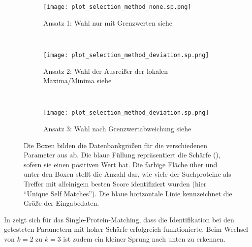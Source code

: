         \begin{figure}[H]
            \centering
            \begin{subfigure}{\textwidth}
                \texttt{[image: plot\_selection\_method\_none.sp.png]}
                \caption{Ansatz 1: Wahl nur mit Grenzwerten siehe }
                \label{fig:selection_method.none.sp}
            \end{subfigure}\\
            \begin{subfigure}{\textwidth}
                \texttt{[image: plot\_selection\_method\_deviation.sp.png]}
                \caption{Ansatz 2: Wahl der Ausreißer der lokalen Maxima/Minima siehe }
                \label{fig:selection_method.absolute.sp}
            \end{subfigure}\\
            \begin{subfigure}{\textwidth}
                \texttt{[image: plot\_selection\_method\_deviation.sp.png]}
                \caption{Ansatz 3: Wahl nach Grenzwertabweichung siehe }
                \label{fig:selection_method.deviation.sp}
            \end{subfigure}
            \caption[Single-Protein-Matching ]{Die Boxen bilden die Datenbankgrößen für die verschiedenen Parameter aus  ab. Die blaue Füllung repräsentiert die Schärfe (), sofern sie einen positiven Wert hat. Die farbige Fläche über und unter den Boxen stellt die Anzahl dar, wie viele der Suchproteine als Treffer mit alleinigem besten Score identifiziert wurden (hier ``Unique Self Matches''). Die blaue horizontale Linie kennzeichnet die Größe der Eingabedaten.}
            \label{fig:selection_method.sp}
        \end{figure}

        In  zeigt sich für das Single-Protein-Matching, dass die Identifikation bei den getesteten Parametern mit hoher Schärfe erfolgreich funktionierte. Beim Wechsel von $k=2$ zu $k=3$ ist zudem ein kleiner Sprung nach unten zu erkennen.

